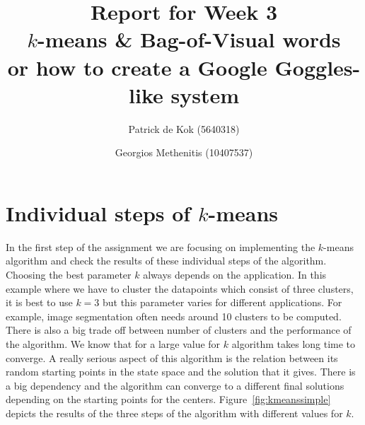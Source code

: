 \documentclass[a4paper,10pt,twoside]{article}
\title{Report for Week 3 \\\normalsize $k$-means \& Bag-of-Visual words\\ or how to create a Google Goggles-like system}
\author{Patrick de Kok (5640318) \and Georgios Methenitis (10407537)}
\begin{document}
\maketitle
\thispagestyle{empty}

\section{Individual steps of $k$-means}
In the first step of the assignment we are focusing on implementing the $k$-means algorithm and check the results of these individual steps of the algorithm. Choosing the best parameter $k$ always depends on the application. In this example where we have to cluster the datapoints which consist of three clusters, it is best to use $k=3$ but this parameter varies for different applications. For example, image segmentation often needs around 10 clusters to be computed. There is also a big trade off between number of clusters and the performance of the algorithm. We know that for a large value for $k$ algorithm takes long time to converge.
A really serious aspect of this algorithm is the relation between its random starting points in the state space and the solution that it gives. There is a big dependency and the algorithm can converge to a different final solutions depending on the starting points for the centers. Figure~\ref{fig:kmeanssimple} depicts the results of the three steps of the algorithm with different values for $k$.
\end{document}
